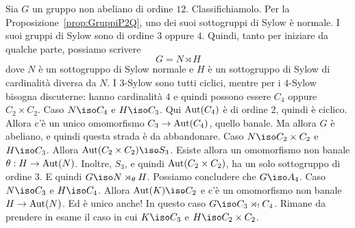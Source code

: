 \begin{osse}
Sia $G$ un gruppo non abeliano di ordine $12$. Classifichiamolo.\newline
Per la Proposizione~\ref{prop:GruppiP2Q}, uno dei suoi sottogruppi di Sylow è normale. I suoi gruppi di Sylow sono di ordine $3$ oppure $4$. Quindi, tanto per iniziare da qualche parte, possiamo scrivere
\[G = N \rtimes H\]
dove $N$ è un sottogruppo di Sylow normale e $H$ è un sottogruppo di Sylow di cardinalità diversa da $N$. I $3$-Sylow sono tutti ciclici, mentre per i $4$-Sylow bisogna discuterne: hanno cardinalità $4$ e quindi possono essere $C_4$ oppure $C_2 \times C_2$.\newline
Caso $N \iso C_4$ e $H \iso C_3$. Qui $\mathrm{Aut}(C_4)$ è di ordine $2$, quindi è ciclico. Allora c'è un unico omomorfismo $C_3 \to \mathrm{Aut}(C_4)$, quello banale. Ma allora $G$ è abeliano, e quindi questa strada è da abbandonare.\newline
Caso $N \iso C_2 \times C_2$ e $H \iso C_3$. Allora $\Aut(C_2 \times C_2) \iso S_3$.  Esiste allora un omomorfismo non banale $\theta : H \to \mathrm{Aut}(N)$. Inoltre, $S_3$, e quindi $\mathrm{Aut}(C_2 \times C_2)$, ha un solo sottogruppo di ordine $3$.  E quindi $G \iso N \rtimes_\theta H$. Possiamo concludere che $G \iso A_4$. \newline
Caso $N \iso C_3$ e $H \iso C_4$. Allora $\Aut(K) \iso C_2$ e c'è un omomorfismo non banale $H \to \mathrm{Aut}(N)$. Ed è unico anche! In questo caso $G \iso C_3 \rtimes_! C_4$.\newline
Rimane da prendere in esame il caso in cui $K \iso C_3$ e $H \iso C_2 \times C_2$. 
\end{osse}


